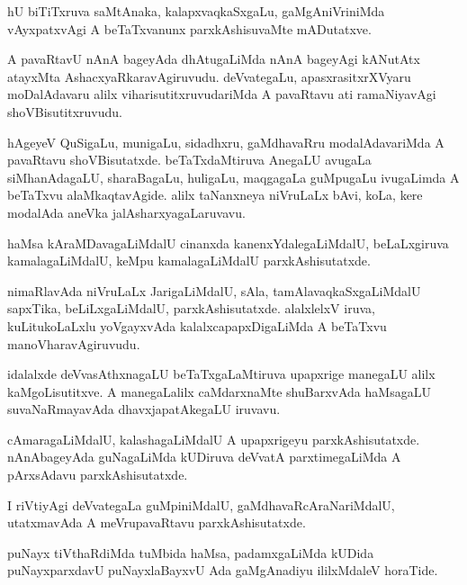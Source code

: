 \documentclass{article}
\begin{document}
\begin{mn}
hU biTiTxruva saMtAnaka,  kalapxvaqkaSxgaLu, gaMgAniVriniMda  vAyxpatxvAgi 
A beTaTxvanunx parxkAshisuvaMte mADutatxve. 
\end{mn}

\begin{mn}
A pavaRtavU nAnA bageyAda dhAtugaLiMda nAnA bageyAgi kANutAtx atayxMta 
AshacxyaRkaravAgiruvudu.  deVvategaLu, apasxrasitxrXVyaru moDalAdavaru 
alilx viharisutitxruvudariMda A  pavaRtavu ati ramaNiyavAgi shoVBisutitxruvudu. 
\end{mn}

\begin{mn}
hAgeyeV QuSigaLu, munigaLu, sidadhxru, gaMdhavaRru modalAdavariMda A pavaRtavu 
shoVBisutatxde.  beTaTxdaMtiruva AnegaLU avugaLa siMhanAdagaLU, sharaBagaLu, 
huligaLu, maqgagaLa guMpugaLu ivugaLimda A beTaTxvu alaMkaqtavAgide. alilx 
taNanxneya niVruLaLx bAvi, koLa, kere modalAda aneVka jalAsharxyagaLaruvavu. 
\end{mn}

\begin{mn}
haMsa kAraMDavagaLiMdalU cinanxda kanenxYdalegaLiMdalU, beLaLxgiruva 
kamalagaLiMdalU, keMpu kamalagaLiMdalU parxkAshisutatxde.
\end{mn}

\begin{mn}
nimaRlavAda  niVruLaLx JarigaLiMdalU, sAla, tamAlavaqkaSxgaLiMdalU sapxTika,  
beLiLxgaLiMdalU, parxkAshisutatxde. alalxlelxV iruva, kuLitukoLaLxlu 
yoVgayxvAda kalalxcapapxDigaLiMda A beTaTxvu manoVharavAgiruvudu.
\end{mn}

\begin{mn}
idalalxde deVvasAthxnagaLU beTaTxgaLaMtiruva upapxrige manegaLU  alilx 
kaMgoLisutitxve. A manegaLalilx caMdarxnaMte shuBarxvAda haMsagaLU 
suvaNaRmayavAda dhavxjapatAkegaLU iruvavu.
\end{mn}

\begin{mn}
cAmaragaLiMdalU, kalashagaLiMdalU A upapxrigeyu parxkAshisutatxde. nAnAbageyAda   
guNagaLiMda kUDiruva deVvatA parxtimegaLiMda A pArxsAdavu parxkAshisutatxde.
\end{mn}

\begin{mn}
I riVtiyAgi deVvategaLa guMpiniMdalU, gaMdhavaRcAraNariMdalU, utatxmavAda  
A meVrupavaRtavu parxkAshisutatxde.
\end{mn}

\begin{mn}
puNayx tiVthaRdiMda tuMbida haMsa, padamxgaLiMda kUDida puNayxparxdavU 
puNayxlaBayxvU Ada gaMgAnadiyu ililxMdaleV horaTide. 
\end{mn}
\end{document}
